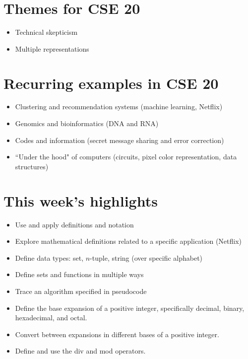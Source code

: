 \documentclass[12pt, oneside]{article}
\begin{document}
\begin{flushright}
\end{flushright}




\newpage
\section*{Themes for CSE 20}
\begin{itemize}
\item Technical skepticism
\item Multiple representations
\end{itemize}

\section*{Recurring examples in CSE 20}
\begin{itemize}
\item Clustering and recommendation systems (machine learning, Netflix)
\item Genomics and bioinformatics (DNA and RNA)
\item Codes and information (secret message sharing and error correction)
\item ``Under the hood" of computers (circuits, pixel color representation, data structures)
\end{itemize}

\section*{This week's highlights}
\begin{itemize}
\item Use and apply definitions and notation
\item Explore mathematical definitions related to a specific application (Netflix)
\item Define data types: set, $n$-tuple, string (over specific alphabet)
\item Define sets and functions in multiple ways
\item Trace an algorithm specified in pseudocode
\item Define the base expansion of a positive integer, specifically decimal, binary, hexadecimal, and octal.
\item Convert between expansions in different bases of a positive integer.
\item Define and use the div and mod operators.
\end{itemize}
\end{document}
